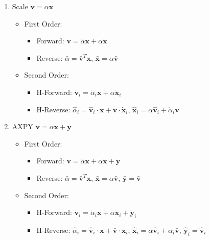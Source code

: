 \documentclass{article}
\newcommand{\vx}{\mathbf{x}}
\newcommand{\vxpi}{\dot{\mathbf{x}}_{i}}
\newcommand{\vxhi}{\hat{\mathbf{x}}_{i}}
\newcommand{\api}{\dot{\alpha}_{i}}
\newcommand{\ahi}{\hat{\alpha}_{i}}
\newcommand{\vypi}{\dot{\mathbf{y}}_{i}}
\newcommand{\vyhi}{\hat{\mathbf{y}}_{i}}
\newcommand{\vvb}{\bar{\mathbf{v}}}
\newcommand{\vvpi}{\dot{\mathbf{v}}_{i}}
\newcommand{\vvhi}{\hat{\mathbf{v}}_{i}}
\begin{document}
\begin{enumerate}
        \item Scale $\mathbf{v} = \alpha \mathbf{x}$
        \begin{itemize}
            \item First Order:
            \begin{itemize}
                \item Forward: $\dot{\mathbf{v}} = \dot{\alpha} \mathbf{x} + \alpha \dot{\mathbf{x}}$
                \item Reverse: $\bar{\alpha} = \bar{\mathbf{v}}^{T} \mathbf{x}$, $\bar{\mathbf{x}} = \alpha \bar{\mathbf{v}}$
            \end{itemize}
            \item Second Order:
            \begin{itemize}
                \item H-Forward: $\vvpi = \api \vx + \alpha \vxpi$
                \item H-Reverse: $\ahi = \vvhi \cdot \vx + \vvb \cdot \vxpi$, $\vxhi = \alpha \vvhi + \api \vvb$
            \end{itemize}
        \end{itemize}

        \item AXPY $\mathbf{v} = \alpha \mathbf{x} + \mathbf{y}$
        \begin{itemize}
            \item First Order:
            \begin{itemize}
                \item Forward: $\dot{\mathbf{v}} = \dot{\alpha} \mathbf{x} + \alpha \dot{\mathbf{x}} + \dot{\mathbf{y}}$
                \item Reverse: $\bar{\alpha} = \bar{\mathbf{v}}^{T} \mathbf{x}$, $\bar{\mathbf{x}} = \alpha \bar{\mathbf{v}}$, $\bar{\mathbf{y}} = \bar{\mathbf{v}}$
            \end{itemize}
            \item Second Order:
            \begin{itemize}
                \item H-Forward: $\vvpi = \api \vx + \alpha \vxpi + \vypi$
                \item H-Reverse: $\ahi = \vvhi \cdot \vx + \vvb \cdot \vxpi$, $\vxhi = \alpha \vvhi + \api \vvb$, $\vyhi = \vvhi$
            \end{itemize}
        \end{itemize}


\end{enumerate}
\end{document}
